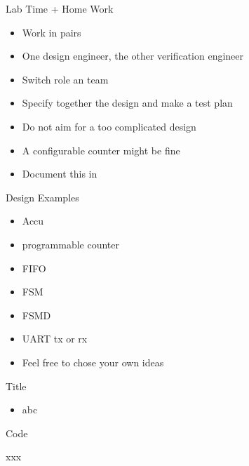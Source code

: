 \begin{frame}[fragile]{Lab Time + Home Work}
\begin{itemize}
\item Work in pairs
\item One design engineer, the other verification engineer
\item Switch role an team
\item Specify together the design and make a test plan
\item Do not aim for a too complicated design
\item A configurable counter might be fine
\item Document this in 
\end{itemize}
\end{frame}

\begin{frame}[fragile]{Design Examples}
\begin{itemize}
\item Accu
\item programmable counter
\item FIFO
\item FSM
\item FSMD
\item UART tx or rx
\item Feel free to chose your own ideas
\end{itemize}
\end{frame}



\begin{frame}[fragile]{Title}
\begin{itemize}
\item abc
\end{itemize}
\end{frame}

\begin{frame}[fragile]{Code}
\begin{chisel}
xxx
\end{chisel}
\end{frame}
